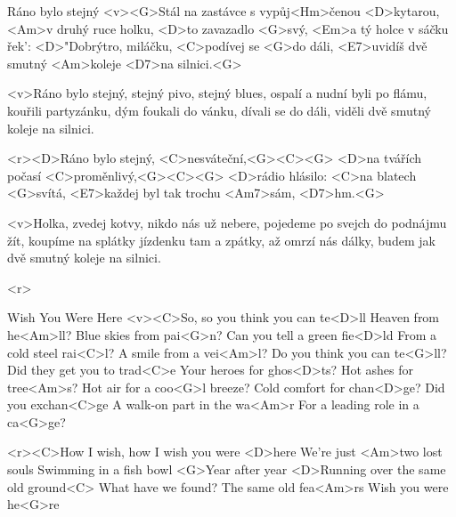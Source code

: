 \begin{song}{76}{Ráno bylo stejný}{}
	<v><G>Stál na zastávce s vypůj<Hm>čenou <D>kytarou,
	<Am>v druhý ruce holku, <D>to zavazadlo <G>svý,
	<Em>a tý holce v sáčku řek': <D>"Dobrýtro, miláčku,
	<C>podívej se <G>do dáli, <E7>uvidíš dvě smutný <Am>koleje <D7>na silnici.<G>

	<v>Ráno bylo stejný, stejný pivo, stejný blues,
	ospalí a nudní byli po flámu,
	kouřili partyzánku, dým foukali do vánku,
	dívali se do dáli, viděli dvě smutný koleje na silnici.

	<r><D>Ráno bylo stejný, <C>nesváteční,<G><C><G>
	<D>na tvářích počasí <C>proměnlivý,<G><C><G>
	<D>rádio hlásilo: <C>na blatech <G>svítá,
	<E7>každej byl tak trochu <Am7>sám, <D7>hm.<G>

	<v>Holka, zvedej kotvy, nikdo nás už nebere,
	pojedeme po svejch do podnájmu žít,
	koupíme na splátky jízdenku tam a zpátky,
	až omrzí nás dálky, budem jak dvě smutný koleje na silnici.

	<r>
\end{song}

\begin{song}{77}{Wish You Were Here}{}
	<v><C>So, so you think you can te<D>ll
	Heaven from he<Am>ll?
	Blue skies from pai<G>n?
	Can you tell a green fie<D>ld
	From a cold steel rai<C>l?
	A smile from a vei<Am>l?
	Do you think you can te<G>ll?
	Did they get you to trad<C>e
	Your heroes for ghos<D>ts?
	Hot ashes for tree<Am>s?
	Hot air for a coo<G>l breeze?
	Cold comfort for chan<D>ge?
	Did you exchan<C>ge
	A walk-on part in the wa<Am>r
	For a leading role in a ca<G>ge?

	<r><C>How I wish, how I wish you were <D>here
	We're just <Am>two lost souls
	Swimming in a fish bowl
	<G>Year after year
	<D>Running over the same old ground<C>
	What have we found?
	The same old fea<Am>rs
	Wish you were he<G>re
\end{song}

